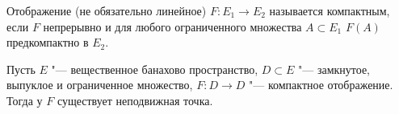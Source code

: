\documentclass[main]{subfiles}
\begin{document}
\begin{definition}
  Отображение (не обязательно линейное)
  \( F : E_1 \to E_2 \)
  называется компактным, если
  \( F \) непрерывно и для любого ограниченного
  множества \( A \subset E_1 \)
  \( F(A) \) предкомпактно в \( E_2 \).
\end{definition}

\begin{theorem}[Шаудер, б/д]
  Пусть \( E \) "--- вещественное банахово пространство,
  \( D \subset E \) "---
  замкнутое, выпуклое и ограниченное множество,
  \( F : D \to D \) "--- компактное отображение.
  Тогда у \( F \) существует неподвижная точка.
\end{theorem}
\end{document}
